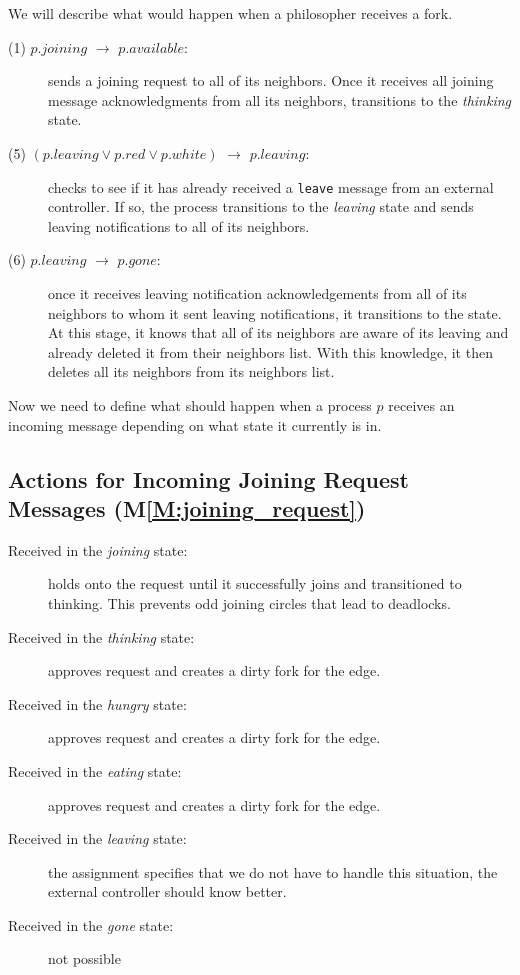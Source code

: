 \documentclass[11pt]{article}
\begin{document}
We will describe what would happen when a philosopher receives a fork.


\begin{description}
\item[(1) $p.joining$ $\to$ $p.available$:] sends a joining request to all of its neighbors. Once it receives all joining message acknowledgments from all its neighbors, transitions to the \textit{thinking} state.

\item[(5) $(p.leaving \vee p.red \vee p.white)$ $\to$ $p.leaving$:] checks to see if it has already received a \texttt{leave} message from an external controller. If so, the process transitions to the \textit{leaving} state and sends leaving notifications to all of its neighbors. 

\item[(6) $p.leaving$ $\to$ $p.gone$:]
once it receives leaving notification acknowledgements from all of its neighbors to whom it sent leaving notifications, it transitions to the \gone state. At this stage, it knows that all of its neighbors are aware of its leaving and already deleted it from their neighbors list. With this knowledge, it then deletes all its neighbors from its neighbors list.
\end{description}

Now we need to define what should happen when a process $p$ receives an incoming message depending on what state it currently is in.

\subsection{Actions for Incoming Joining Request Messages (M\ref{M:joining_request})}
\begin{description}
\item[Received in the \textit{joining} state:] holds onto the request until it successfully joins and transitioned to thinking. This prevents odd joining circles that lead to deadlocks.
\item[Received in the \textit{thinking} state:] approves request and creates a dirty fork for the edge.
\item[Received in the \textit{hungry} state:] approves request and creates a dirty fork for the edge.
\item[Received in the \textit{eating} state:] approves request and creates a dirty fork for the edge.
\item[Received in the \textit{leaving} state:] the assignment specifies that we do not have to handle this situation, the external controller should know better.
\item[Received in the \textit{gone} state:] not possible
\end{description}
\end{document}
